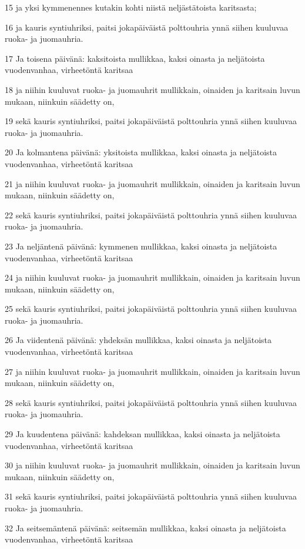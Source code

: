 \par 15 ja yksi kymmenennes kutakin kohti niistä neljästätoista karitsasta;
\par 16 ja kauris syntiuhriksi, paitsi jokapäiväistä polttouhria ynnä siihen kuuluvaa ruoka- ja juomauhria.
\par 17 Ja toisena päivänä: kaksitoista mullikkaa, kaksi oinasta ja neljätoista vuodenvanhaa, virheetöntä karitsaa
\par 18 ja niihin kuuluvat ruoka- ja juomauhrit mullikkain, oinaiden ja karitsain luvun mukaan, niinkuin säädetty on,
\par 19 sekä kauris syntiuhriksi, paitsi jokapäiväistä polttouhria ynnä siihen kuuluvaa ruoka- ja juomauhria.
\par 20 Ja kolmantena päivänä: yksitoista mullikkaa, kaksi oinasta ja neljätoista vuodenvanhaa, virheetöntä karitsaa
\par 21 ja niihin kuuluvat ruoka- ja juomauhrit mullikkain, oinaiden ja karitsain luvun mukaan, niinkuin säädetty on,
\par 22 sekä kauris syntiuhriksi, paitsi jokapäiväistä polttouhria ynnä siihen kuuluvaa ruoka- ja juomauhria.
\par 23 Ja neljäntenä päivänä: kymmenen mullikkaa, kaksi oinasta ja neljätoista vuodenvanhaa, virheetöntä karitsaa
\par 24 ja niihin kuuluvat ruoka- ja juomauhrit mullikkain, oinaiden ja karitsain luvun mukaan, niinkuin säädetty on,
\par 25 sekä kauris syntiuhriksi, paitsi jokapäiväistä polttouhria ynnä siihen kuuluvaa ruoka- ja juomauhria.
\par 26 Ja viidentenä päivänä: yhdeksän mullikkaa, kaksi oinasta ja neljätoista vuodenvanhaa, virheetöntä karitsaa
\par 27 ja niihin kuuluvat ruoka- ja juomauhrit mullikkain, oinaiden ja karitsain luvun mukaan, niinkuin säädetty on,
\par 28 sekä kauris syntiuhriksi, paitsi jokapäiväistä polttouhria ynnä siihen kuuluvaa ruoka- ja juomauhria.
\par 29 Ja kuudentena päivänä: kahdeksan mullikkaa, kaksi oinasta ja neljätoista vuodenvanhaa, virheetöntä karitsaa
\par 30 ja niihin kuuluvat ruoka- ja juomauhrit mullikkain, oinaiden ja karitsain luvun mukaan, niinkuin säädetty on,
\par 31 sekä kauris syntiuhriksi, paitsi jokapäiväistä polttouhria ynnä siihen kuuluvaa ruoka- ja juomauhria.
\par 32 Ja seitsemäntenä päivänä: seitsemän mullikkaa, kaksi oinasta ja neljätoista vuodenvanhaa, virheetöntä karitsaa
